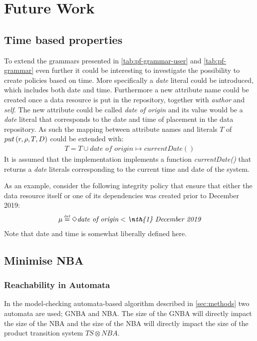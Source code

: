 \section{Future Work}\label{sec:future-work}
\subsection{Time based properties}
To extend the grammars presented in \autoref{tab:pf-grammar-user} and \autoref{tab:pf-grammar} even further it could be interesting to investigate the possibility to create policies based on time. More specifically a \emph{date} literal could be introduced, which includes both date and time. Furthermore a new attribute name could be created once a data resource is put in the repository, together with \emph{author} and \emph{self}. The new attribute could be called \emph{date of origin} and its value would be a \emph{date} literal that corresponds to the date and time of placement in the data repository. As such the mapping between attribute names and literals $T$ of $put \left( r, \rho, T, D \right)$ could be extended with:
\begin{align*}
    T = T \cup \textit{date of origin} \mapsto currentDate()
\end{align*}
It is assumed that the implementation implements a function \emph{currentDate()} that returns a \emph{date} literals corresponding to the current time and date of the system.

As an example, consider the following integrity policy that ensure that either the data resource itself or one of its dependencies was created prior to  December 2019:
\begin{align*}
    \inte \eqdef \F \textit{date of origin} < \textit{\nth{1} December 2019}
\end{align*}
Note that date and time is somewhat liberally defined here.

\subsection{Minimise NBA}

\subsubsection{Reachability in Automata}\label{sec:reach}
In the model-checking automata-based algorithm described in \autoref{sec:methods} two automata are used; GNBA and NBA. The size of the GNBA will directly impact the size of the NBA and the size of the NBA will directly impact the size of the product transition system $TS \otimes NBA$. 

